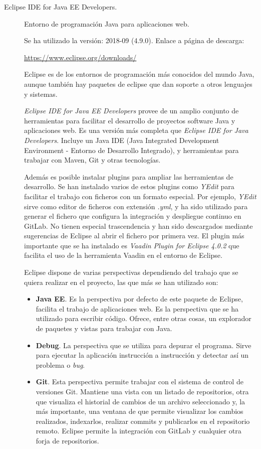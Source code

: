 \begin{description}
	\item[Eclipse IDE for Java EE Developers.] Entorno de programación Java para aplicaciones web. 
	
		Se ha utilizado la versión: 2018-09 (4.9.0). Enlace a página de descarga:
		
		\url{https://www.eclipse.org/downloads/}
	
		Eclipse es de los entornos de programación más conocidos del mundo Java, aunque también hay paquetes de eclipse que dan soporte a otros lenguajes y sistemas. 
		
		\textit{Eclipse IDE for Java EE Developers} provee de un amplio conjunto de herramientas para facilitar el desarrollo de proyectos software Java y aplicaciones web. Es una versión más completa que \textit{Eclipse IDE for Java Developers}. Incluye un Java IDE (Java Integrated Development Environment - Entorno de Desarrollo Integrado), y herramientas para trabajar con Maven, Git y otras tecnologías. 
		
		Además es posible instalar plugins para ampliar las herramientas de desarrollo. Se han instalado varios de estos plugins como \textit{YEdit} para facilitar el trabajo con ficheros con un formato especial. Por ejemplo, \textit{YEdit} sirve como editor de ficheros con extensión \textit{.yml}, y ha sido utilizado para generar el fichero que configura la integración y despliegue continuo en GitLab. No tienen especial trascendencia y han sido descargados mediante sugerencias de Eclipse al abrir el fichero por primera vez. El plugin más importante que se ha instalado es \textit{Vaadin Plugin for Eclipse 4.0.2} que facilita el uso de la herramienta Vaadin en el entorno de Eclipse.
		
		Eclipse dispone de varias perspectivas dependiendo del trabajo que se quiera realizar en el proyecto, las que más se han utilizado son:
		\begin{itemize}
			\item \textbf{Java EE}. Es la perspectiva por defecto de este paquete de Eclipse, facilita el trabajo de aplicaciones web. Es la perspectiva que se ha utilizado para escribir código. Ofrece, entre otras cosas, un explorador de paquetes y vistas para trabajar con Java.
			\item \textbf{Debug}. La perspectiva que se utiliza para depurar el programa. Sirve para ejecutar la aplicación instrucción a instrucción y detectar así un problema o \textit{bug}.
			\item \textbf{Git}. Esta perspectiva permite trabajar con el sistema de control de versiones Git. Mantiene una vista con un listado de repositorios, otra que visualiza el historial de cambios de un archivo seleccionado y, la más importante, una ventana de que permite visualizar los cambios realizados, indexarlos, realizar commits y publicarlos en el repositorio remoto. Eclipse permite la integración con GitLab y cualquier otra forja de repositorios.
		\end{itemize}
		

\end{description}
